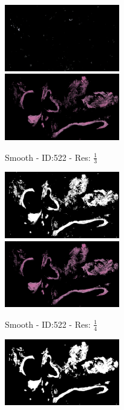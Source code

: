 \documentclass[a4paper,10pt,oneside]{article}
\begin{document}
\begin{figure}[hbtp]
\begin{subfigure}[b]{5cm}
    \includegraphics[width=5cm]{visualization/results/smoothhistogram/res_reduce_3/Region_1_PO13-00522A1_1_2_201305171639.png}
    \includegraphics[width=5cm]{visualization/results/smoothhistogram/res_reduce_3/Region_2_PO13-00522A1_1_2_201305171639.png}
    \caption{Smooth - ID:522 - Res: $\frac{1}{3}$}
  \end{subfigure}
  \begin{subfigure}[b]{5cm}
    \includegraphics[width=5cm]{visualization/results/smoothhistogram/res_reduce_4/Region_0_PO13-00522A1_1_2_201305171639.png}
    \includegraphics[width=5cm]{visualization/results/smoothhistogram/res_reduce_4/Region_1_PO13-00522A1_1_2_201305171639.png}
    \caption{Smooth - ID:522 - Res: $\frac{1}{4}$}
  \end{subfigure}
  \begin{subfigure}[b]{5cm}
    \includegraphics[width=5cm]{visualization/results/smoothhistogram/res_reduce_5/Region_0_PO13-00522A1_1_2_201305171639.png}

\end{subfigure}
\end{figure}
\end{document}
